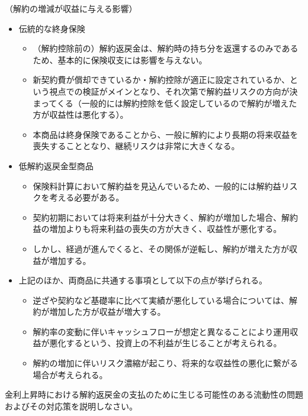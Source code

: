 \documentclass[report,gutter=10mm,fore-edge=10mm,uplatex,dvipdfmx]{jlreq}
\begin{document}
（解約の増減が収益に与える影響）
\begin{itemize}
 \item 伝統的な終身保険
       \begin{itemize}
	\item （解約控除前の）解約返戻金は、解約時の持ち分を返還するのみであるため、基本的に保険収支には影響を与えない。
	\item 新契約費が償却できているか・解約控除が適正に設定されているか、という視点での検証がメインとなり、それ次第で解約益リスクの方向が決まってくる（一般的には解約控除を低く設定しているので解約が増えた方が収益性は悪化する）。
	\item 本商品は終身保険であることから、一般に解約により長期の将来収益を喪失することとなり、継続リスクは非常に大きくなる。
       \end{itemize}

 \item 低解約返戻金型商品
       \begin{itemize}
	\item 保険料計算において解約益を見込んでいるため、一般的には解約益リスクを考える必要がある。
	\item 契約初期においては将来利益が十分大きく、解約が増加した場合、解約益の増加よりも将来利益の喪失の方が大きく、収益性が悪化する。
	\item しかし、経過が進んでくると、その関係が逆転し、解約が増えた方が収益が増加する。
       \end{itemize}
 \item 上記のほか、両商品に共通する事項として以下の点が挙げられる。
       \begin{itemize}
	\item 逆ざや契約など基礎率に比べて実績が悪化している場合については、解約が増加した方が収益が増大する。
	\item 解約率の変動に伴いキャッシュフローが想定と異なることにより運用収益が悪化するという、投資上の不利益が生じることが考えられる。
	\item 解約の増加に伴いリスク濃縮が起こり、将来的な収益性の悪化に繋がる場合が考えられる。
       \end{itemize}
\end{itemize}



金利上昇時における解約返戻金の支払のために生じる可能性のある流動性の問題およびその対応策を説明しなさい。

\end{document}
